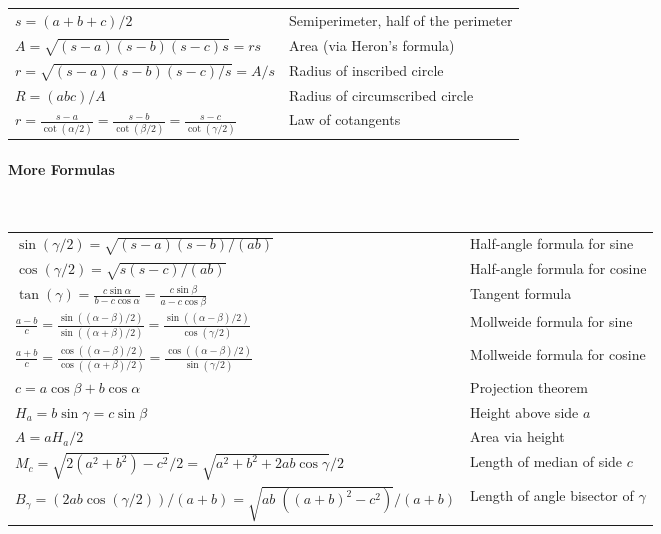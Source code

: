 \medskip
\begin{tabular}{l l}
 $s = (a+b+c)/2$                       & Semiperimeter, half of the perimeter \\
 $A = \sqrt{(s-a)(s-b)(s-c) s} = r s$  & Area (via Heron's formula) \\
 $r = \sqrt{(s-a)(s-b)(s-c)/s} = A/s$  & Radius of inscribed circle \\  
 $R = (abc)/ A$                        & Radius of circumscribed circle \\
 $r = \frac{s-a}{\cot(\alpha/2)}
    = \frac{s-b}{\cot(\beta/2)}
    = \frac{s-c}{\cot(\gamma/2)}$      & Law of cotangents\\
\end{tabular}
\medskip


\paragraph{More Formulas} $ $ \newline

\begin{tabular}{l l}
 $\sin(\gamma / 2) = \sqrt{ (s-a)(s-b) / (a b)  }$      & Half-angle formula for sine \\
 $\cos(\gamma / 2) = \sqrt{ s(s-c) / (a b)  }$          & Half-angle formula for cosine \\
 $\tan( \gamma) = \frac{c \sin \alpha}{b - c \cos \alpha}
              = \frac{c \sin \beta} {a - c \cos \beta}$ & Tangent formula  \\
 $\frac{a-b}{c} 
   = \frac{\sin( (\alpha - \beta)/2) } { \sin( (\alpha + \beta)/2) }
   = \frac{\sin( (\alpha - \beta)/2) } { \cos( \gamma/2) } $
                                                        & Mollweide formula for sine \\
 $\frac{a+b}{c} 
 = \frac{\cos( (\alpha - \beta)/2) } { \cos( (\alpha + \beta)/2) }
 = \frac{\cos( (\alpha - \beta)/2) } { \sin( \gamma/2) } $
                                                        & Mollweide formula for cosine \\
 $c = a \cos \beta + b \cos \alpha$                     & Projection theorem \\  
 $H_a = b \sin \gamma = c \sin \beta$                   & Height above side $a$ \\ 
 $A = a H_a / 2$                                        & Area via height \\
 $M_c = \sqrt{2(a^2+b^2) - c^2}/2
      = \sqrt{a^2+b^2 +2ab\cos\gamma}/2$                & Length of median of side $c$ \\
 $B_{\gamma} = (2ab\cos(\gamma/2))/(a+b)
      = \sqrt{ab \; ((a+b)^2-c^2)}/(a+b)$               & Length of angle bisector of $\gamma$
\end{tabular}
\medskip


